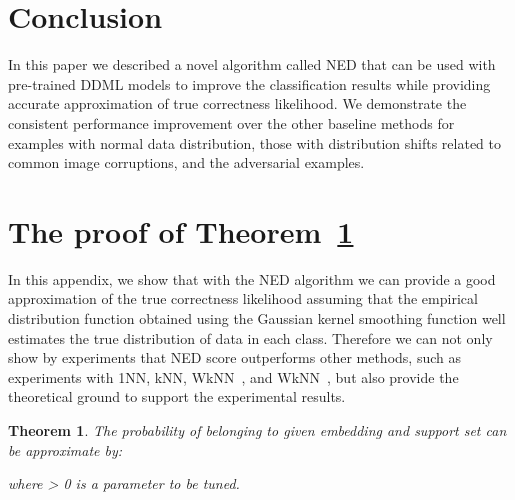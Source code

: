 \documentclass{article}
\newtheorem{theorem}{Theorem}
\begin{document}
\section{Conclusion}

In this paper we described a novel algorithm called NED that can be used with pre-trained DDML models
to improve the classification results while providing accurate approximation of true correctness likelihood.
We demonstrate the consistent performance improvement over the other baseline methods
for examples with normal data distribution,
those with distribution shifts related to common image corruptions,
and the adversarial examples.






{\small
	
	
}

\pagebreak

\appendix
\section{The proof of Theorem~\ref{theorem}}
In this appendix, we show that with the NED algorithm we can provide a good approximation of the true correctness likelihood assuming that the empirical distribution function obtained using the Gaussian kernel smoothing function well estimates the true distribution of data in each class.
Therefore we can not only show by experiments that NED score outperforms other methods, such as experiments with 1NN, kNN, WkNN~\cite{b70}, and WkNN~\cite{b69}, but also provide the theoretical ground to support the experimental results.

\label{sec:ned-interpretation}
\begin{theorem}
	\label{theorem}
	The probability  of  belonging to  given embedding  and support set  can be approximate by:
	
	where  > 0 is a parameter to be tuned.
\end{theorem}
\end{document}

